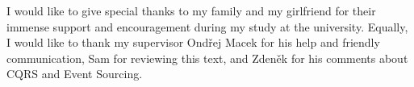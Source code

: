 \documentclass[11pt,twoside,a4paper]{book}
\begin{document}
	
	\translate				%

	


	\coverpagestarts


	\acknowledgements
	\noindent
	I would like to give special thanks to my family and my girlfriend for their immense support and encouragement during my study at the university. Equally, I would like to thank my supervisor Ondřej Macek for his help and friendly communication, Sam for reviewing this text, and Zdeněk for his comments about CQRS and Event Sourcing.



\end{document}
